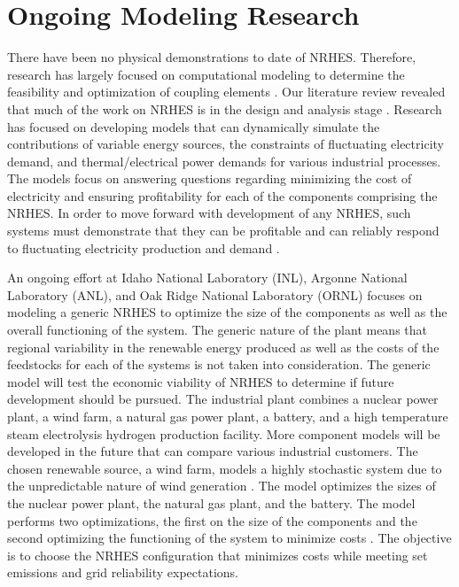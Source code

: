 \documentclass[12pt]{UIdahoMastersThesis}
\begin{document}
\section{Ongoing Modeling Research}
There have been no physical demonstrations to date of NRHES. Therefore, research has largely focused on computational modeling to determine the feasibility and optimization of coupling elements \cite{Rabiti2015, Boardman2013, Shropshire2012}. Our literature review revealed that much of the work on NRHES is in the design and analysis stage \cite{Epiney2016, Boardman2013, Shropshire2012}. Research has focused on developing models that can dynamically simulate the contributions of variable energy sources, the constraints of fluctuating electricity demand, and thermal/electrical power demands for various industrial processes. The models focus on answering questions regarding minimizing the cost of electricity and ensuring profitability for each of the components comprising the NRHES. In order to move forward with development of any NRHES, such systems must demonstrate that they can be profitable and can reliably respond to fluctuating electricity production and demand \cite{Rabiti2015}. 

An ongoing effort at Idaho National Laboratory (INL), Argonne National Laboratory (ANL), and Oak Ridge National Laboratory (ORNL) focuses on modeling a generic NRHES to optimize the size of the components as well as the overall functioning of the system. The generic nature of the plant means that regional variability in the renewable energy produced as well as the costs of the feedstocks for each of the systems is not taken into consideration. The generic model will test the economic viability of NRHES to determine if future development should be pursued. The industrial plant combines a nuclear power plant, a wind farm, a natural gas power plant, a battery, and a high temperature steam electrolysis hydrogen production facility. More component models will be developed in the future that can compare various industrial customers\cite{Harrison2016}. The chosen renewable source, a wind farm, models a highly stochastic system due to the unpredictable nature of wind generation \cite{Chen2016_wind}. The model optimizes the sizes of the nuclear power plant, the natural gas plant, and the battery. The model performs two optimizations, the first on the size of the components and the second optimizing the functioning of the system to minimize costs \cite{redfoot_rabiti_2018}. The objective is to choose the NRHES configuration that minimizes costs while meeting set emissions and grid reliability expectations.
\end{document}
